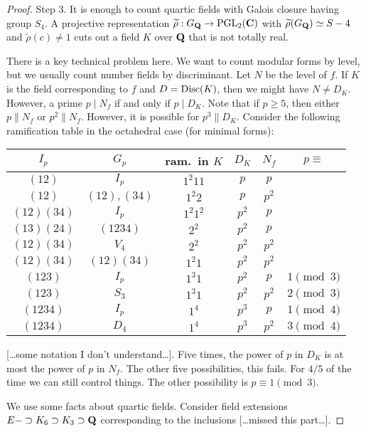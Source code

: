 \begin{proof}
Step 3. It is enough to count quartic fields with Galois closure having group 
$S_4$. A projective representation 
$\widetilde\rho:G_{\mathbf{Q}} \to \operatorname{PGL}_2(\mathbf{C})$ with 
$\widetilde\rho(G_{\mathbf{Q}})\simeq S-4$ and $\widetilde\rho(c)\ne 1$ cuts out a field 
$K$ over $\mathbf{Q}$ that is not totally real. 

There is a key technical problem here. We want to count modular forms by level, 
but we usually count number fields by discriminant. Let $N$ be the level of 
$f$. If $K$ is the field corresponding to $f$ and $D=\operatorname{Disc}(K)$, then 
we might have $N\ne D_K$. However, a prime $p\mid N_f$ if and only if 
$p\mid D_K$. Note that if $p\geqslant 5$, then either $p\| N_f$ or 
$p^2\| N_f$. However, it is possible for $p^3\| D_K$. Consider the following 
ramification table in the octahedral case (for minimal forms): 
\begin{center}
\begin{tabular}{c|c|c|c|c|c}
$I_p$ & $G_p$ & ram.~in $K$ & $D_K$ & $N_f$ & $p\equiv$ \\ \hline
$(12)$     & $I_p$       & $1^2 11$ & $p$ & $p$ \\
$(12)$     & $(12),(34)$ & $1^2 2$  & $p$ & $p^2$ \\
$(12)(34)$ & $I_p$       & $1^2 1^{\underline 2}$ & $p^2$ & $p$\\
$(13)(24)$ & $(1234)$    & $2^2$    & $p^2$ & $p$ \\
$(12)(34)$ & $V_4$       & $2^2$    & $p^2$ & $p^2$ \\
$(12)(34)$ & $(12)(34)$  & $1^2 1$  & $p^2$ & $p^2$ \\
$(123)$    & $I_p$       & $1^3 1$  & $p^2$ & $p$   & $1\pmod 3$ \\
$(123)$    & $S_3$       & $1^3 1$  & $p^2$ & $p^2$ & $2\pmod 3$ \\
$(1234)$   & $I_p$       & $1^4 $   & $p^3$ & $p$   & $1\pmod 4$ \\
$(1234)$   & $D_4$       & $1^4$    & $p^3$ & $p^2$ & $3\pmod 4$ 
\end{tabular}
\end{center}
[\ldots some notation I don't understand\ldots]. 
Five times, the power of $p$ in $D_K$ is at most the power of $p$ in 
$N_f$. The other five possibilities, this fails. For $4/5$ of the time we can 
still control things. The other possibility is $p\equiv 1\pmod 3$. 

We use some facts about quartic fields. Consider field extensions 
$E-\supset K_6\supset K_3\supset \mathbf{Q}$ corresponding to the inclusions 
[\ldots missed this part\ldots]. 


\end{proof}
